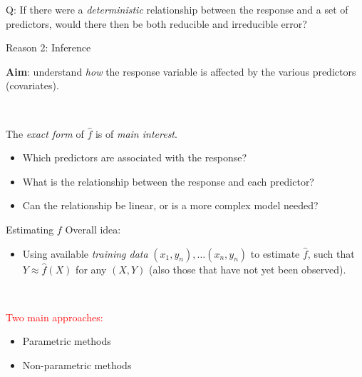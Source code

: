 \documentclass[
  ignorenonframetext,
]{beamer}
\providecommand{\tightlist}{%
  \setlength{\itemsep}{0pt}\setlength{\parskip}{0pt}}
\begin{document}
\begin{frame}
\begin{block}{Q: If there were a \emph{deterministic} relationship
between the response and a set of predictors, would there then be both
reducible and irreducible error?}
\protect\hypertarget{q-if-there-were-a-deterministic-relationship-between-the-response-and-a-set-of-predictors-would-there-then-be-both-reducible-and-irreducible-error}{}
\end{block}
\end{frame}

\begin{frame}
\begin{block}{Reason 2: Inference}
\protect\hypertarget{reason-2-inference}{}
\(~\)

\textbf{Aim}: understand \emph{how} the response variable is affected by
the various predictors (covariates).

\(~\)

The \emph{exact form} of \(\hat{f}\) is of \emph{main interest}.

\vspace{2mm}

\begin{itemize}
\tightlist
\item
  Which predictors are associated with the response?
\item
  What is the relationship between the response and each predictor?
\item
  Can the relationship be linear, or is a more complex model needed?
\end{itemize}
\end{block}
\end{frame}

\begin{frame}{Estimating \(f\)}
\protect\hypertarget{estimating-f}{}
Overall idea:

\begin{itemize}
\tightlist
\item
  Using available \emph{training data} \((x_1,y_n),\ldots (x_n,y_n)\) to
  estimate \(\hat{f}\), such that \(Y\approx \hat{f}(X)\) for any
  \((X,Y)\) (also those that have not yet been observed).
\end{itemize}

\(~\)

\textcolor{red}{Two main approaches:}

\begin{itemize}
\tightlist
\item
  Parametric methods
\item
  Non-parametric methods
\end{itemize}
\end{frame}
\end{document}
